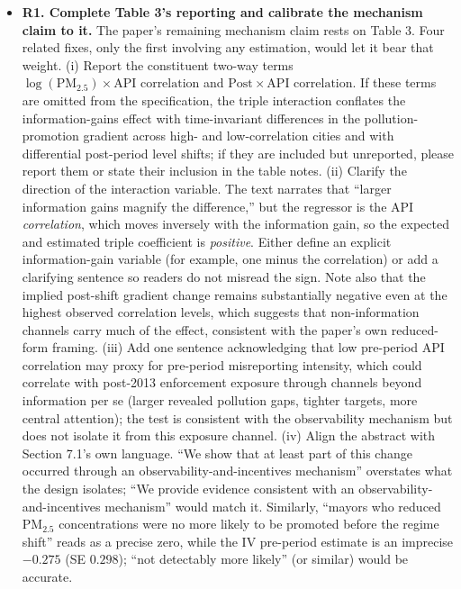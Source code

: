 \documentclass[12pt]{article}
\begin{document}
\begin{itemize}
    \item \textbf{R1. Complete Table 3's reporting and calibrate the mechanism claim to it.}
    The paper's remaining mechanism claim rests on Table 3. Four related fixes, only the first involving any estimation, would let it bear that weight.
    (i) Report the constituent two-way terms $\log(\mathrm{PM}_{2.5}) \times \text{API correlation}$ and $\mathrm{Post} \times \text{API correlation}$. If these terms are omitted from the specification, the triple interaction conflates the information-gains effect with time-invariant differences in the pollution-promotion gradient across high- and low-correlation cities and with differential post-period level shifts; if they are included but unreported, please report them or state their inclusion in the table notes.
    (ii) Clarify the direction of the interaction variable. The text narrates that ``larger information gains magnify the difference,'' but the regressor is the API \emph{correlation}, which moves inversely with the information gain, so the expected and estimated triple coefficient is \emph{positive}. Either define an explicit information-gain variable (for example, one minus the correlation) or add a clarifying sentence so readers do not misread the sign. Note also that the implied post-shift gradient change remains substantially negative even at the highest observed correlation levels, which suggests that non-information channels carry much of the effect, consistent with the paper's own reduced-form framing.
    (iii) Add one sentence acknowledging that low pre-period API correlation may proxy for pre-period misreporting intensity, which could correlate with post-2013 enforcement exposure through channels beyond information per se (larger revealed pollution gaps, tighter targets, more central attention); the test is consistent with the observability mechanism but does not isolate it from this exposure channel.
    (iv) Align the abstract with Section 7.1's own language. ``We show that at least part of this change occurred through an observability-and-incentives mechanism'' overstates what the design isolates; ``We provide evidence consistent with an observability-and-incentives mechanism'' would match it. Similarly, ``mayors who reduced PM$_{2.5}$ concentrations were no more likely to be promoted before the regime shift'' reads as a precise zero, while the IV pre-period estimate is an imprecise $-0.275$ (SE $0.298$); ``not detectably more likely'' (or similar) would be accurate.


\end{itemize}
\end{document}
